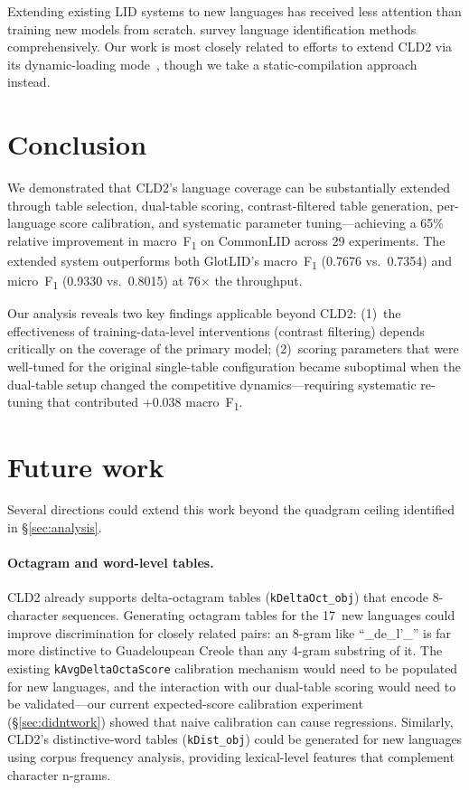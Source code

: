 \documentclass{article}
\newcommand{\fone}{F\textsubscript{1}}
\begin{document}
Extending existing LID systems to new languages has received less attention than training new models from scratch.
\citet{jauhiainen2019automatic} survey language identification methods comprehensively.
Our work is most closely related to efforts to extend CLD2 via its dynamic-loading mode~\citep{cld2dynamic}, though we take a static-compilation approach instead.

\section{Conclusion}

We demonstrated that CLD2's language coverage can be substantially extended through table selection, dual-table scoring, contrast-filtered table generation, per-language score calibration, and systematic parameter tuning---achieving a 65\% relative improvement in macro~\fone{} on CommonLID across 29 experiments.
The extended system outperforms both GlotLID's macro~\fone{} (0.7676 vs.\ 0.7354) and micro~\fone{} (0.9330 vs.\ 0.8015) at 76$\times$ the throughput.

Our analysis reveals two key findings applicable beyond CLD2:
(1)~the effectiveness of training-data-level interventions (contrast filtering) depends critically on the coverage of the primary model;
(2)~scoring parameters that were well-tuned for the original single-table configuration became suboptimal when the dual-table setup changed the competitive dynamics---requiring systematic re-tuning that contributed +0.038 macro~\fone{}.

\section{Future work}
\label{sec:future}

Several directions could extend this work beyond the quadgram ceiling identified in \S\ref{sec:analysis}.

\paragraph{Octagram and word-level tables.}
CLD2 already supports delta-octagram tables (\texttt{kDeltaOct\_obj}) that encode 8-character sequences.
Generating octagram tables for the 17~new languages could improve discrimination for closely related pairs: an 8-gram like ``\_de\_l'\_'' is far more distinctive to Guadeloupean Creole than any 4-gram substring of it.
The existing \texttt{kAvgDeltaOctaScore} calibration mechanism would need to be populated for new languages, and the interaction with our dual-table scoring would need to be validated---our current expected-score calibration experiment (\S\ref{sec:didntwork}) showed that naive calibration can cause regressions.
Similarly, CLD2's distinctive-word tables (\texttt{kDist\_obj}) could be generated for new languages using corpus frequency analysis, providing lexical-level features that complement character n-grams.
\end{document}

